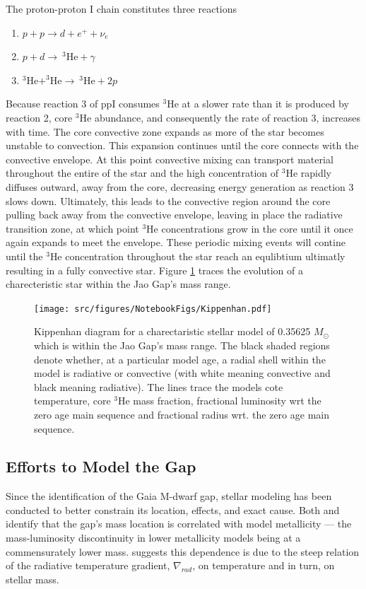 The proton-proton I chain constitutes three reactions 
\begin{enumerate} 
	\item $p + p \longrightarrow d + e^{+} + \nu_{e}$
	\item $p + d \longrightarrow \ ^{3}\text{He} + \gamma$
	\item $^{3}\text{He} + ^{3}\text{He} \longrightarrow \ ^{3}\text{He} + 2p$ 
\end{enumerate} 
Because reaction 3 of ppI consumes $^{3}$He at a slower rate than it is
produced by reaction 2, core $^{3}$He abundance, and consequently the rate of
reaction 3, increases with time. The core convective zone expands as more of
the star becomes unstable to convection. This expansion continues until the
core connects with the convective envelope. At this point convective mixing can
transport material throughout the entire of the star and the high concentration
of $^{3}$He rapidly diffuses outward, away from the core, decreasing energy
generation as reaction 3 slows down. Ultimately, this leads to the convective
region around the core pulling back away from the convective envelope, leaving
in place the radiative transition zone, at which point $^{3}$He concentrations
grow in the core until it once again expands to meet the envelope.  These
periodic mixing events will contine until the $^{3}$He concentration throughout
the star reach an equlibtium ultimatly resulting in a fully convective star.
Figure \ref{fig:Kippenhan1} traces the evolution of a charecteristic star
within the Jao Gap's mass range.

\begin{figure}
	\centering
	\texttt{[image: src/figures/NotebookFigs/Kippenhan.pdf]}
	\caption{Kippenhan diagram for a charectaristic stellar model of 0.35625
	$M_{\odot}$ which is within the Jao Gap's mass range. The black shaded
	regions denote whether, at a particular model age, a radial shell within
	the model is radiative or convective (with white meaning convective and
	black meaning radiative). The lines trace the models cote temperature, core
	$^{3}$He mass fraction, fractional luminosity wrt the zero age main
	sequence and fractional radius wrt. the zero age main sequence.}
	\label{fig:Kippenhan1}
\end{figure}


\subsection{Efforts to Model the Gap}
Since the identification of the Gaia M-dwarf gap, stellar modeling has been
conducted to better constrain its location, effects, and exact cause.
Both \citet{Mansfield2021} and \citet{Feiden2021} identify that the gap's mass
location is correlated with model metallicity --- the mass-luminosity
discontinuity in lower metallicity models being at a commensurately lower mass.
\citet{Feiden2021} suggests this dependence is due to the steep relation of
the radiative temperature gradient, $\nabla_{rad}$, on temperature and in turn,
on stellar mass.

